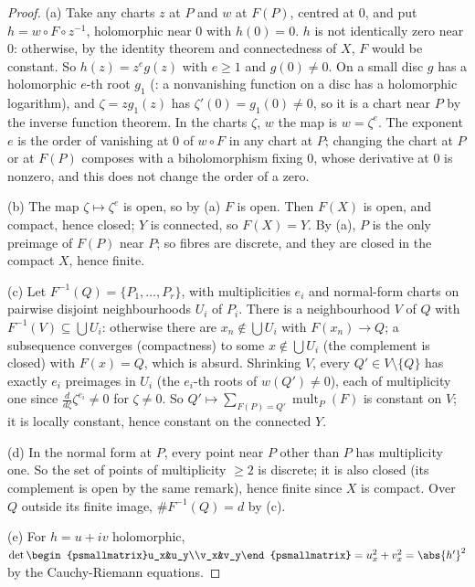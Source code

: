 \begin{proof}
(a) Take any charts $z$ at $P$ and $w$ at $F(P)$, centred at $0$, and put $h=w\circ F\circ z^{-1}$, holomorphic near $0$ with $h(0)=0$. $h$ is not identically zero near $0$:
otherwise, by the identity theorem and connectedness of $X$, $F$ would be constant. So $h(z)=z^eg(z)$ with $e\ge1$ and $g(0)\ne0$. On a small disc $g$ has a
holomorphic $e$-th root $g_1$ (: a nonvanishing function on a disc has a holomorphic logarithm), and $\zeta=zg_1(z)$ has $\zeta'(0)=g_1(0)\ne0$, so it is a
chart near $P$ by the inverse function theorem. In the charts $\zeta$, $w$ the map is $w=\zeta^e$. The exponent $e$ is the order of vanishing at $0$ of $w\circ F$ in any
chart at $P$; changing the chart at $P$ or at $F(P)$ composes with a biholomorphism fixing $0$, whose derivative at $0$ is nonzero, and this does not change the order
of a zero.

(b) The map $\zeta\mapsto\zeta^e$ is open, so by (a) $F$ is open. Then $F(X)$ is open, and compact, hence closed; $Y$ is connected, so $F(X)=Y$. By (a), $P$ is the only
preimage of $F(P)$ near $P$; so fibres are discrete, and they are closed in the compact $X$, hence finite.

(c) Let $F^{-1}(Q)=\{P_1,\dots,P_r\}$, with multiplicities $e_i$ and normal-form charts on pairwise disjoint neighbourhoods $U_i$ of $P_i$. There is a
neighbourhood $V$ of $Q$ with $F^{-1}(V)\subseteq\bigcup U_i$: otherwise there are $x_n\notin\bigcup U_i$ with $F(x_n)\to Q$; a subsequence converges (compactness) to
some $x\notin\bigcup U_i$ (the complement is closed) with $F(x)=Q$, which is absurd. Shrinking $V$, every $Q'\in V\setminus\{Q\}$ has exactly $e_i$ preimages in $U_i$
(the $e_i$-th roots of $w(Q')\ne0$), each of multiplicity one since $\frac d{d\zeta}\zeta^{e_i}\ne0$ for $\zeta\ne0$. So $Q'\mapsto\sum_{F(P)=Q'}\operatorname{mult}_P(F)$ is constant on
$V$; it is locally constant, hence constant on the connected $Y$.

(d) In the normal form at $P$, every point near $P$ other than $P$ has multiplicity one. So the set of points of multiplicity $\ge2$ is discrete; it is also closed
(its complement is open by the same remark), hence finite since $X$ is compact. Over $Q$ outside its finite image, $\#F^{-1}(Q)=d$ by (c).

(e) For $h=u+iv$ holomorphic, $\det\begin{psmallmatrix}u_x&u_y\\v_x&v_y\end{psmallmatrix}=u_x^2+v_x^2=\abs{h'}^2$ by the Cauchy-Riemann equations.
\end{proof}

